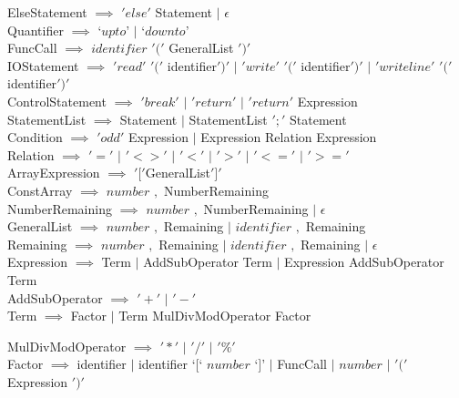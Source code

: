 \documentclass[a4paper,11pt]{article}
\begin{document}
\begin{tcolorbox}
ElseStatement $\implies$ $'else'$ Statement $|$ $\epsilon$ \\
Quantifier $\implies$ $‘up to’$ $|$ $‘down to’$       \\       
FuncCall $\implies$ $identifier$ $'('$ GeneralList $')'$ \\
IOStatement $\implies$ $'read'$ $'('$ identifier$')'$
$|$ $'write'$ $'('$ identifier$')'$            
$|$ $'writeline'$ $'('$identifier$')'$ \\
ControlStatement $\implies$ $'break'$ $|$ $'return'$
$|$ $'return'$ Expression \\
StatementList $\implies$ Statement $|$ StatementList $';'$ Statement \\
Condition $\implies$ $'odd'$ Expression $|$ Expression Relation Expression \\
Relation $\implies$ $'='$ $|$ $'<>'$ $|$ $'<'$ $|$ $'>'$ $|$ $'<='$ $|$ $'>='$ \\
ArrayExpression $\implies$ $'['$GeneralList$']'$ \\
ConstArray $\implies$ $number$ $,$ NumberRemaining \\
NumberRemaining $\implies$ $number$ $,$ NumberRemaining $|$ $\epsilon$ \\
GeneralList $\implies$ $number$ $,$ Remaining
      $|$ $identifier$ $,$ Remaining \\
Remaining $\implies$ $number$ $,$ Remaining 
           $|$ $identifier$ $,$ Remaining 
           $|$ $\epsilon$ \\
Expression $\implies$ Term 
            $|$ AddSubOperator Term
            $|$ Expression AddSubOperator Term \\
AddSubOperator $\implies$ $'+'$ $|$ $'-'$ \\
Term $\implies$ Factor 
      $|$ Term MulDivModOperator Factor \\

\end{tcolorbox}

\begin{tcolorbox}
MulDivModOperator $\implies$ $'*'$ $|$ $'/'$ $|$ $'\%'$
\\ Factor $\implies$ identifier 
        $|$ identifier $‘[‘$ $ number$ $‘]’$
        $|$ FuncCall
        $|$ $number$ 
        $|$ $'('$ Expression $')'$ \\
\end{tcolorbox}
 
\end{document}
